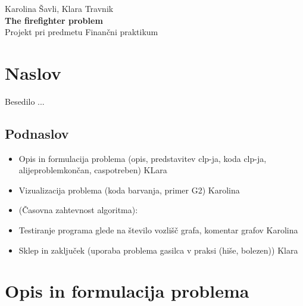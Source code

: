 \documentclass[a4paper, 12pt]{article}
\begin{document}
    
\thispagestyle{empty}
\vfill

\begin{center}{\large
Karolina Šavli, Klara Travnik\\[5mm]
{\Huge \bf The firefighter problem}\\[5mm]
Projekt pri predmetu Finančni praktikum\\[1cm]}
\end{center}
\vfill

\pagebreak


\tableofcontents

\pagebreak



\section{Naslov}
Besedilo ...

\subsection{Podnaslov}
\begin{itemize}
    \item Opis in formulacija problema (opis, predstavitev clp-ja, koda clp-ja, alijeproblemkončan, caspotreben) KLara
    \item Vizualizacija problema (koda barvanja, primer G2) Karolina
    \item (Časovna zahtevnost algoritma): 
    \item Testiranje programa glede na število vozlišč grafa, komentar grafov Karolina
    \item Sklep in zaključek (uporaba problema gasilca v praksi (hiše, bolezen)) Klara
\end{itemize}


\pagebreak

\section{Opis in formulacija problema}
\end{document}
